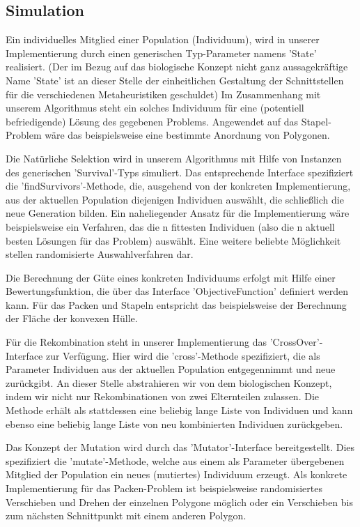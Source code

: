\documentclass[runningheads,a4paper]{llncs}
\begin{document}
\subsection{Simulation}

Ein individuelles Mitglied einer Population (Individuum), wird in unserer Implementierung durch einen generischen Typ-Parameter namens 'State' realisiert. (Der im Bezug auf das biologische Konzept nicht ganz aussagekräftige Name 'State' ist an dieser Stelle der einheitlichen Gestaltung der Schnittstellen für die verschiedenen Metaheuristiken geschuldet) Im Zusammenhang mit unserem Algorithmus steht ein solches Individuum für eine (potentiell befriedigende) Lösung des gegebenen Problems. Angewendet auf das Stapel-Problem wäre das beispielsweise eine bestimmte Anordnung von Polygonen.

Die Natürliche Selektion wird in unserem Algorithmus mit Hilfe von Instanzen des generischen 'Survival'-Typs simuliert. Das entsprechende Interface spezifiziert die 'findSurvivors'-Methode, die, ausgehend von der konkreten Implementierung, aus der aktuellen Population diejenigen Individuen auswählt, die schließlich die neue Generation bilden. Ein naheliegender Ansatz für die Implementierung wäre beispielsweise ein Verfahren, das die n fittesten Individuen (also die n aktuell besten Lösungen für das Problem) auswählt. Eine weitere beliebte Möglichkeit stellen randomisierte Auswahlverfahren dar.

Die Berechnung der Güte eines konkreten Individuums erfolgt mit Hilfe einer Bewertungsfunktion, die über das Interface 'ObjectiveFunction' definiert werden kann. Für das Packen und Stapeln entspricht das beispielsweise der Berechnung der Fläche der konvexen Hülle.

Für die Rekombination steht in unserer Implementierung das 'CrossOver'-Interface zur Verfügung. Hier wird die 'cross'-Methode spezifiziert, die als Parameter Individuen aus der aktuellen Population entgegennimmt und neue zurückgibt. An dieser Stelle abstrahieren wir von dem biologischen Konzept, indem wir nicht nur Rekombinationen von zwei Elternteilen zulassen. Die Methode erhält als stattdessen eine beliebig lange Liste von Individuen und kann ebenso eine beliebig lange Liste von neu kombinierten Individuen zurückgeben.     

Das Konzept der Mutation wird durch das 'Mutator'-Interface bereitgestellt. Dies spezifiziert die 'mutate'-Methode, welche aus einem als Parameter übergebenen Mitglied der Population ein neues (mutiertes) Individuum erzeugt. Als konkrete Implementierung für das Packen-Problem ist beispielsweise randomisiertes Verschieben und Drehen der einzelnen Polygone möglich oder ein Verschieben bis zum nächsten Schnittpunkt mit einem anderen Polygon.
\end{document}
